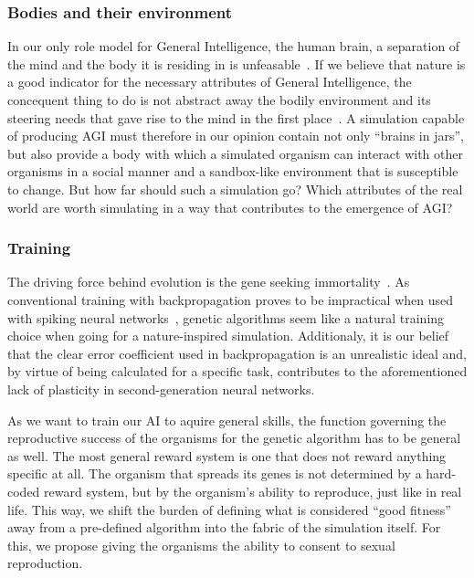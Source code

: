 \subsubsection{Bodies and their environment}
In our only role model for General Intelligence, the human brain, a separation of the mind and
the body it is residing in is unfeasable~\cite{Dudai2014}. If we believe that nature is a good 
indicator for the necessary attributes of General Intelligence, the concequent thing to do is not 
abstract away the bodily environment and its steering needs that gave rise to the mind in the first place~\cite{Jekely2010}. 
A simulation capable of producing AGI must therefore in our opinion contain not only ``brains in jars'', but 
also provide a body with which a simulated organism can interact with other organisms in a social manner and a 
sandbox-like environment that is susceptible to change.
But how far should such a simulation go? Which attributes of the real world are worth simulating in a way 
that contributes to the emergence of AGI\@?

\subsubsection{Training}
The driving force behind evolution is the gene seeking immortality~\cite{Dawkins1976}.
As conventional training with backpropagation proves to be impractical when used with
spiking neural networks~\cite{Paugam-Moisy2012}, genetic algorithms seem like a natural training choice
when going for a nature-inspired simulation. Additionaly, it is our belief that the clear error
coefficient used in backpropagation is an unrealistic ideal and, by virtue of being calculated for
a specific task, contributes to the aforementioned lack of plasticity in second-generation neural networks.

As we want to train our AI to aquire general skills, the function governing the reproductive success of
the organisms for the genetic algorithm has to be general as well. The most general reward system
is one that does not reward anything specific at all. The organism that spreads its 
genes is not determined by a hard-coded reward system, but by the organism's ability to reproduce, 
just like in real life. This way, we shift the burden of defining what is considered ``good fitness''
away from a pre-defined algorithm into the fabric of the simulation itself.
For this, we propose giving the organisms the ability to consent to sexual reproduction.

